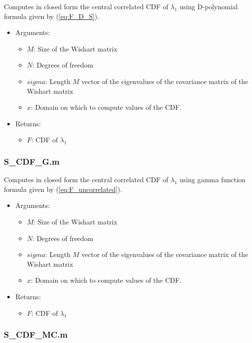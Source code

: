 Computes in closed form the central correlated CDF of $\lambda_1$ using D-polynomial formula given by (\ref{eq:F_D_S}). 

\begin{itemize}
\item Arguments:
\begin{itemize}
\item $M$: Size of the Wishart matrix
\item $N$: Degrees of freedom
\item $sigma$: Length $M$ vector of the eigenvalues of the covariance matrix of the Wishart matrix
\item $x$: Domain on which to compute values of the CDF.
\end{itemize}
\item Returns:
\begin{itemize}
\item $F$: CDF of $\lambda_1$
\end{itemize}
\end{itemize}

\subsubsection*{S\_CDF\_G.m}

Computes in closed form the central correlated CDF of $\lambda_1$ using gamma function formula given by (\ref{eq:F_uncorrelated}). 

\begin{itemize}
\item Arguments:
\begin{itemize}
\item $M$: Size of the Wishart matrix
\item $N$: Degrees of freedom
\item $sigma$: Length $M$ vector of the eigenvalues of the covariance matrix of the Wishart matrix
\item $x$: Domain on which to compute values of the CDF.
\end{itemize}
\item Returns:
\begin{itemize}
\item $F$: CDF of $\lambda_1$
\end{itemize}
\end{itemize}




\subsubsection*{S\_CDF\_MC.m}

